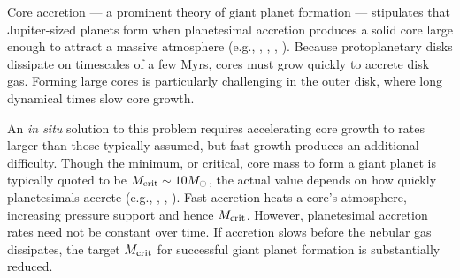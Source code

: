 \documentclass[apj]{emulateapj}
\begin{document}

Core accretion --- a prominent theory of giant planet formation --- stipulates that Jupiter-sized planets form when planetesimal accretion produces a solid core large enough to attract a massive atmosphere   (e.g., \citealt{mizuno78}, \citealt{stevenson82}, \citealt{boden86}, \citealt{dangelo11}). Because protoplanetary disks dissipate on timescales of a few Myrs, cores must grow quickly to accrete disk gas. Forming large cores is particularly challenging in the outer disk, where long dynamical times slow core growth. %

An \textit{in situ} solution to this problem requires accelerating core growth to rates larger than those typically assumed, but fast growth produces an additional difficulty.  Though the minimum, or critical, core mass to form a giant planet is typically quoted to be $M_{\rm crit}\sim 10M_{\oplus}$, the actual value depends on how quickly planetesimals accrete (e.g., \citealt{ikoma00}, \citealt{pollack96}, \citealt{rafikov06}).  Fast accretion heats a core's  atmosphere, increasing pressure support and hence $M_{\rm crit}$.   However, planetesimal accretion rates need not be constant over time.  If  accretion slows before the nebular gas dissipates, the target $M_{\rm crit}$ for successful giant planet formation is substantially reduced.
\end{document}
